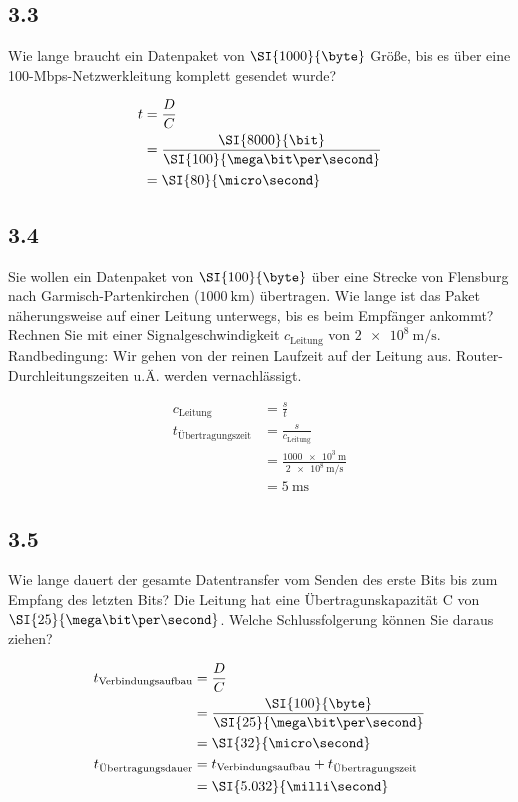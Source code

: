     \subsection*{3.3}

    Wie lange braucht ein Datenpaket von $\SI{1000}{\byte}$ Größe, bis es über eine 100-Mbps-Netzwerkleitung komplett gesendet wurde?

    \begin{align}
        t &= \frac{D}{C}\\
          &= \frac{\SI{8000}{\bit}}{\SI{100}{\mega\bit\per\second}}\\
          &= \SI{80}{\micro\second}
    \end{align}

    \subsection*{3.4}

    Sie wollen ein Datenpaket von $\SI{100}{\byte}$ über eine Strecke von Flensburg nach Garmisch-Partenkirchen ($\SI{1000}{\kilo\meter}$)
    übertragen. Wie lange ist das Paket näherungsweise auf einer Leitung unterwegs, bis es beim Empfänger ankommt? Rechnen Sie mit einer Signalgeschwindigkeit
    $c_{\text{Leitung}}$ von $\SI{2e8}{\meter\per\second}.$
    Randbedingung: Wir gehen von der reinen Laufzeit auf der Leitung aus. Router-Durchleitungszeiten u.Ä. werden
    vernachlässigt.

    \begin{align}
        c_{\text{Leitung}} &= \frac{s}{t}\\
        t_{\text{Übertragungszeit}} &= \frac{s}{c_{\text{Leitung}}}\\
          &= \frac{\SI{1000e3}{\meter}}{\SI{2e8}{\meter\per\second}}\\
          &= \SI{5}{\milli\second}
    \end{align}

    \subsection*{3.5}

    Wie lange dauert der gesamte Datentransfer vom Senden des erste Bits bis zum Empfang des letzten Bits? Die Leitung hat eine Übertragunskapazität
    C von $\SI{25}{\mega\bit\per\second}$. Welche Schlussfolgerung können Sie daraus ziehen?

    \begin{align}
      t_{\text{Verbindungsaufbau}} &= \frac{D}{C}\\
        &= \frac{\SI{100}{\byte}}{\SI{25}{\mega\bit\per\second}}\\
        &= \SI{32}{\micro\second}\\
      t_{\text{Übertragungsdauer}} &= t_{\text{Verbindungsaufbau}} + t_{\text{Übertragungszeit}}\\
        &= \SI{5.032}{\milli\second}
    \end{align}


